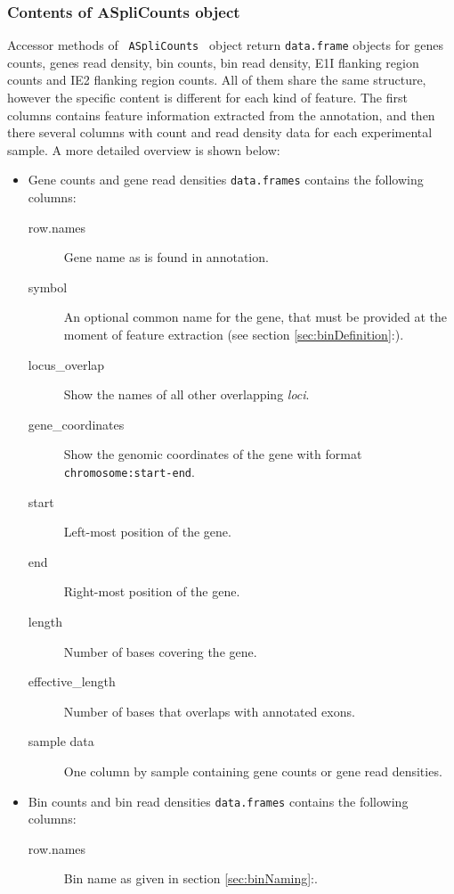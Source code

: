 \documentclass{article}
\begin{document}
\subsubsection{Contents of ASpliCounts object }
\label{sec:countsContents}
Accessor methods of \texttt{ ASpliCounts } object return \texttt{data.frame}
objects for genes counts, genes read density, bin counts, bin read density, E1I
flanking region counts and IE2 flanking region counts. All of them share the
same structure, however the specific content is different for each kind of 
feature. The first columns contains feature information extracted from the
annotation, and then there several columns with count and read density data for
each experimental sample. A more detailed overview is shown below:

\begin{itemize}
  \item Gene counts and gene read densities \texttt{data.frames} contains the
  following columns:
    \begin{description}
      \item[row.names] Gene name as is found in annotation.
      \item[symbol] An optional common name for the gene, that must be provided at
      the moment of feature extraction (see section \ref{sec:binDefinition}:).
      \item[locus\_overlap] Show the names of all other overlapping \textit{loci}.
      \item[gene\_coordinates] Show the genomic coordinates of the gene with
      format \texttt{chromosome:start-end}.
      \item[start] Left-most position of the gene.
      \item[end] Right-most position of the gene.
      \item[length] Number of bases covering the gene.
      \item[effective\_length] Number of bases that overlaps with annotated exons.
      \item[sample data] One column by sample containing gene counts or gene read
      densities.
      \\
    \end{description} 
  \item Bin counts and bin read densities \texttt{data.frames} contains the
  following columns:
    \begin{description}
      \item[row.names] Bin name as given in section \ref{sec:binNaming}:.

\end{description}
\end{itemize}
\end{document}
